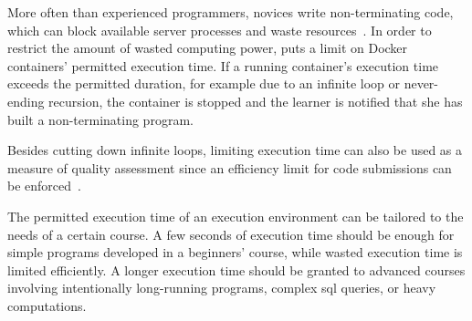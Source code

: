 More often than experienced programmers, novices write non-terminating code, which can block available server processes and waste resources~\cite{loewis2014scaling}. In order to restrict the amount of wasted computing power, \tool puts a limit on Docker containers' permitted execution time. If a running container's execution time exceeds the permitted duration, for example due to an infinite loop or never-ending recursion, the container is stopped and the learner is notified that she has built a non-terminating program.

Besides cutting down infinite loops, limiting execution time can also be used as a measure of quality assessment since an efficiency limit for code submissions can be enforced~\cite{pieterse2013automated}.

The permitted execution time of an execution environment can be tailored to the needs of a certain course. A few seconds of execution time should be enough for simple programs developed in a beginners' course, while wasted execution time is limited efficiently. A longer execution time should be granted to advanced courses involving intentionally long-running programs, complex \gls{sql} queries, or heavy computations.
